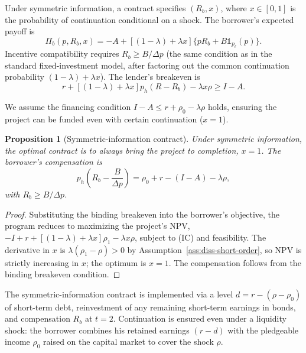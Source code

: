 \documentclass[11pt,a4paper,oneside]{book}
\def\leq{\leqslant}
\def\geq{\geqslant}
\theoremstyle{plain}
\newtheorem{proposition}[theorem]{Proposition}
\theoremstyle{definition}
\theoremstyle{remark}
\numberwithin{equation}{chapter}
\begin{document}
Under symmetric information, a contract specifies $(R_b, x)$, where $x \in [0, 1]$ is the probability of continuation conditional on a shock.
The borrower's expected payoff is
\begin{equation}\label{eq:diss-short-sym-payoff}
  \Pi_b(p, R_b, x) = -A + [(1 - \lambda) + \lambda x] \{p R_b + B \mathbb{1}_{p_\ell}(p)\}.
\end{equation}
Incentive compatibility requires $R_b \geq B/\Delta p$ (the same condition as in the standard fixed-investment model, after factoring out the common continuation probability $(1 - \lambda) + \lambda x$).
The lender's breakeven is
\begin{equation}\label{eq:diss-short-sym-breakeven}
  r + [(1 - \lambda) + \lambda x] p_h (R - R_b) - \lambda x \rho \geq I - A.
\end{equation}

We assume the financing condition $I - A \leq r + \rho_0 - \lambda \rho$ holds, ensuring the project can be funded even with certain continuation ($x = 1$).

\begin{proposition}[Symmetric-information contract]\label{prop:diss-short-sym}
Under symmetric information, the optimal contract is to always bring the project to completion, $x = 1$.
The borrower's compensation is
\begin{equation}\label{eq:diss-short-sym-Rb}
  p_h \left( R_b - \frac{B}{\Delta p} \right) = \rho_0 + r - (I - A) - \lambda \rho,
\end{equation}
with $R_b \geq B/\Delta p$.
\end{proposition}

\begin{proof}
Substituting the binding breakeven into the borrower's objective, the program reduces to maximizing the project's NPV, $-I + r + [(1 - \lambda) + \lambda x] \rho_1 - \lambda x \rho$, subject to (IC) and feasibility.
The derivative in $x$ is $\lambda(\rho_1 - \rho) > 0$ by Assumption~\ref{ass:diss-short-order}, so NPV is strictly increasing in $x$; the optimum is $x = 1$.
The compensation follows from the binding breakeven condition.
\end{proof}

The symmetric-information contract is implemented via a level $d = r - (\rho - \rho_0)$ of short-term debt, reinvestment of any remaining short-term earnings in bonds, and compensation $R_b$ at $t = 2$.
Continuation is ensured even under a liquidity shock: the borrower combines his retained earnings $(r - d)$ with the pledgeable income $\rho_0$ raised on the capital market to cover the shock $\rho$.
\end{document}
